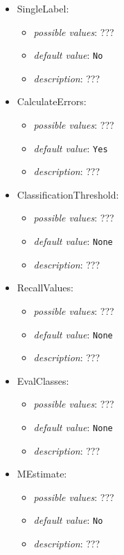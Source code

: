 \documentclass{article}
\begin{document}
\begin{itemize}
    \item SingleLabel:
           \begin{itemize}
                \item \emph{possible values}: ???
                \item \emph{default value}: \texttt{No}
                \item \emph{description}: ???
           \end{itemize}
    \item CalculateErrors:
           \begin{itemize}
                \item \emph{possible values}: ???
                \item \emph{default value}: \texttt{Yes}
                \item \emph{description}: ???
           \end{itemize}
    \item ClassificationThreshold:
           \begin{itemize}
                \item \emph{possible values}: ???
                \item \emph{default value}: \texttt{None}
                \item \emph{description}: ???
           \end{itemize}
    \item RecallValues:
           \begin{itemize}
                \item \emph{possible values}: ???
                \item \emph{default value}: \texttt{None}
                \item \emph{description}: ???
           \end{itemize}
    \item EvalClasses:
           \begin{itemize}
                \item \emph{possible values}: ???
                \item \emph{default value}: \texttt{None}
                \item \emph{description}: ???
           \end{itemize}
    \item MEstimate:
           \begin{itemize}
                \item \emph{possible values}: ???
                \item \emph{default value}: \texttt{No}
                \item \emph{description}: ???
           \end{itemize}
\end{itemize}
\end{document}

